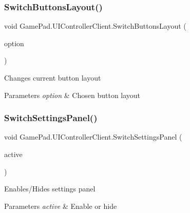 \subsubsection{\texorpdfstring{SwitchButtonsLayout()}{SwitchButtonsLayout()}}
{\footnotesize\ttfamily void Game\+Pad.\+U\+I\+Controller\+Client.\+Switch\+Buttons\+Layout (\begin{DoxyParamCaption}\item[{\mbox{\hyperlink{namespace_game_pad_ad65f651e47321df25402246e8df26c37}{Buttons\+Layout\+Options}}}]{option }\end{DoxyParamCaption})}



Changes current button layout 


\begin{DoxyParams}{Parameters}
{\em option} & Chosen button layout\\
\hline
\end{DoxyParams}
\mbox{\label{class_game_pad_1_1_u_i_controller_client_adf73d4fefd79c649154866d472723253}} 
\subsubsection{\texorpdfstring{SwitchSettingsPanel()}{SwitchSettingsPanel()}}
{\footnotesize\ttfamily void Game\+Pad.\+U\+I\+Controller\+Client.\+Switch\+Settings\+Panel (\begin{DoxyParamCaption}\item[{bool}]{active }\end{DoxyParamCaption})}



Enables/\+Hides settings panel 


\begin{DoxyParams}{Parameters}
{\em active} & Enable or hide\\
\hline
\end{DoxyParams}
\mbox{\label{class_game_pad_1_1_u_i_controller_client_a8b12fd8cebf596535a29ef824beeadaa}} 
